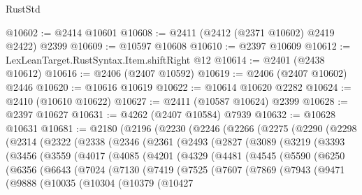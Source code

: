 \begin{lexlean}{RustStd}
\begin{coremodule}
@10602 := @2414 @10601
@10608 := @2411 (@2412 (@2371 @10602) @2419 @2422) @2399
@10609 := @10597 @10608
@10610 := @2397 @10609
@10612 := LexLeanTarget.RustSyntax.Item.shiftRight @12
@10614 := @2401 (@2438 @10612)
@10616 := @2406 (@2407 @10592)
@10619 := @2406 (@2407 @10602) @2446
@10620 := @10616 @10619
@10622 := @10614 @10620 @2282
@10624 := @2410 (@10610 @10622)
@10627 := @2411 (@10587 @10624) @2399
@10628 := @2397 @10627
@10631 := @4262 (@2407 @10584) @7939
@10632 := @10628 @10631
@10681 := @2180
    (@2196
      (@2230
        (@2246
          (@2266
            (@2275
              (@2290
                (@2298
                  (@2314
                    (@2322
                      (@2338
                        (@2346
                          (@2361
                            (@2493
                              (@2827
                                (@3089
                                  (@3219
                                    (@3393
                                      (@3456
                                        (@3559
                                          (@4017
                                            (@4085
                                              (@4201
                                                (@4329
                                                  (@4481
                                                    (@4545
                                                      (@5590
                                                        (@6250
                                                          (@6356
                                                            (@6643
                                                              (@7024
                                                                (@7130
                                                                  (@7419
                                                                    (@7525
                                                                      (@7607
                                                                        (@7869
                                                                          (@7943
                                                                            (@9471
                                                                              (@9888
                                                                                (@10035
                                                                                  (@10304
                                                                                    (@10379
                                                                                      (@10427

\end{coremodule}
\end{lexlean}
